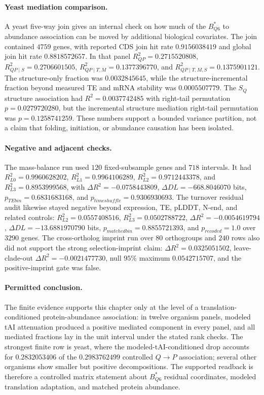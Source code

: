 \paragraph{Yeast mediation comparison.}
A yeast five-way join gives an internal check on how much of the $B^*_{Q6}$ to abundance association can be moved by additional biological covariates.  The join contained $4759$ genes, with reported CDS join hit rate $0.9156038419$ and global join hit rate $0.8818572657$.  In that panel $R^2_{QP}=0.2715520808$, $R^2_{QP\mid S}=0.2706601505$, $R^2_{QP\mid T,M}=0.1377396770$, and $R^2_{QP\mid T,M,S}=0.1375901121$.  The structure-only fraction was $0.0032845645$, while the structure-incremental fraction beyond measured TE and mRNA stability was $0.0005507779$.  The $S_Q$ structure association had $R^2=0.0037742485$ with right-tail permutation $p=0.0279720280$, but the incremental structure mediation right-tail permutation was $p=0.1258741259$.  These numbers support a bounded variance partition, not a claim that folding, initiation, or abundance causation has been isolated.

\paragraph{Negative and adjacent checks.}
The mass-balance run used $120$ fixed-subsample genes and $718$ intervals.  It had $R^2_{L0}=0.9960628202$, $R^2_{L1}=0.9964106289$, $R^2_{L2}=0.9712443378$, and $R^2_{L3}=0.8953999568$, with $\Delta R^2=-0.0758443809$, $\Delta DL=-668.8046070$ bits, $p_{TEbin}=0.6831683168$, and $p_{timeshuffle}=0.9306930693$.  The turnover residual audit likewise stayed negative beyond expression, TE, pLDDT, N-end, and related controls: $R^2_{L2}=0.0557408516$, $R^2_{L3}=0.0502788722$, $\Delta R^2=-0.0054619794$, $\Delta DL=-13.6881970790$ bits, $p_{matchedbin}=0.8855721393$, and $p_{recoded}=1.0$ over $3290$ genes.  The cross-ortholog imprint run over $80$ orthogroups and $240$ rows also did not support the strong selection-imprint claim: $\Delta R^2=0.0325051502$, leave-clade-out $\Delta R^2=-0.0021477730$, null $95\%$ maximum $0.0542715707$, and the positive-imprint gate was false.

\paragraph{Permitted conclusion.}
The finite evidence supports this chapter only at the level of a translation-conditioned protein-abundance association: in twelve organism panels, modeled tAI attenuation produced a positive mediated component in every panel, and all mediated fractions lay in the unit interval under the stated rank checks.  The strongest finite row is yeast, where the modeled-tAI-conditioned drop accounts for $0.2832053406$ of the $0.2983762499$ controlled $Q\to P$ association; several other organisms show smaller but positive decompositions.  The supported readback is therefore a controlled matrix statement about $B^*_{Q6}$ residual coordinates, modeled translation adaptation, and matched protein abundance.

